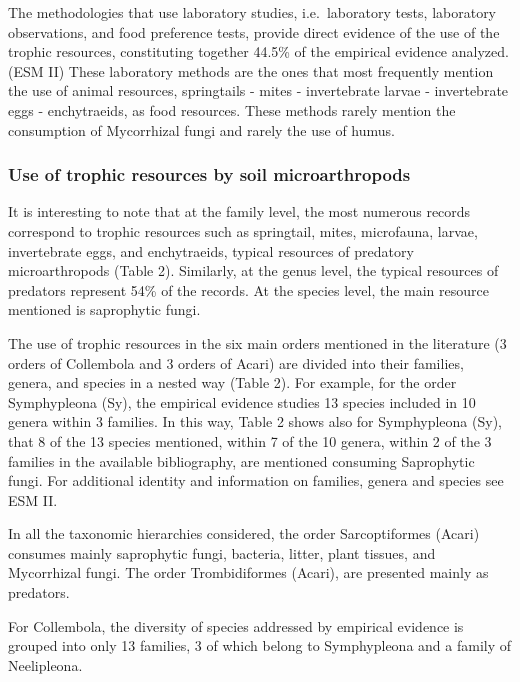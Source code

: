\documentclass[11pt]{article}
\begin{document}
The methodologies that use laboratory studies, i.e.~laboratory tests,
laboratory observations, and food preference tests, provide direct
evidence of the use of the trophic resources, constituting together
44.5\% of the empirical evidence analyzed. (ESM II) These laboratory
methods are the ones that most frequently mention the use of animal
resources, springtails - mites - invertebrate larvae - invertebrate eggs
- enchytraeids, as food resources. These methods rarely mention the
consumption of Mycorrhizal fungi and rarely the use of humus.

\hypertarget{use-of-trophic-resources-by-soil-microarthropods}{%
\subsubsection{Use of trophic resources by soil
microarthropods}\label{use-of-trophic-resources-by-soil-microarthropods}}

It is interesting to note that at the family level, the most numerous
records correspond to trophic resources such as springtail, mites,
microfauna, larvae, invertebrate eggs, and enchytraeids, typical
resources of predatory microarthropods (Table 2). Similarly, at the
genus level, the typical resources of predators represent 54\% of the
records. At the species level, the main resource mentioned is
saprophytic fungi.

The use of trophic resources in the six main orders mentioned in the
literature (3 orders of Collembola and 3 orders of Acari) are divided
into their families, genera, and species in a nested way (Table 2). For
example, for the order Symphypleona (Sy), the empirical evidence studies
13 species included in 10 genera within 3 families. In this way, Table 2
shows also for Symphypleona (Sy), that 8 of the 13 species mentioned,
within 7 of the 10 genera, within 2 of the 3 families in the available
bibliography, are mentioned consuming Saprophytic fungi. For additional
identity and information on families, genera and species see ESM II.

In all the taxonomic hierarchies considered, the order Sarcoptiformes
(Acari) consumes mainly saprophytic fungi, bacteria, litter, plant
tissues, and Mycorrhizal fungi. The order Trombidiformes (Acari), are
presented mainly as predators.

For Collembola, the diversity of species addressed by empirical evidence
is grouped into only 13 families, 3 of which belong to Symphypleona and
a family of Neelipleona.
\end{document}
